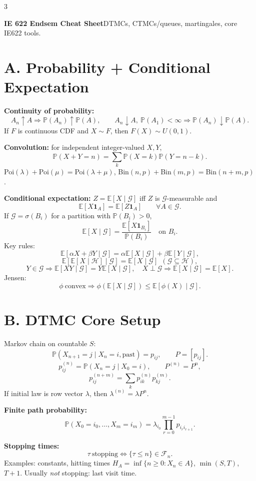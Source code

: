\documentclass[8pt]{extarticle}
\newcommand{\PP}{\mathbb{P}}
\newcommand{\E}{\mathbb{E}}
\newcommand{\1}{\mathbf{1}}
\newcommand{\cF}{\mathcal{F}}
\begin{document}
\tiny

\begin{multicols*}{3}

{\bfseries IE 622 Endsem Cheat Sheet}\hfill DTMCs, CTMCs/queues, martingales, core IE622 tools.\par

\section*{A. Probability + Conditional Expectation}
\textbf{Continuity of probability:}
\[
A_n\uparrow A \Rightarrow \PP(A_n)\uparrow \PP(A),\qquad
A_n\downarrow A,\ \PP(A_1)<\infty \Rightarrow \PP(A_n)\downarrow \PP(A).
\]
If $F$ is continuous CDF and $X\sim F$, then $F(X)\sim U(0,1)$.

\textbf{Convolution:} for independent integer-valued $X,Y$,
\[
\PP(X+Y=n)=\sum_k \PP(X=k)\PP(Y=n-k).
\]
Poi$(\lambda)+$Poi$(\mu)=$Poi$(\lambda+\mu)$, Bin$(n,p)+$Bin$(m,p)=$Bin$(n+m,p)$.

\textbf{Conditional expectation:} $Z=\E[X\mid\mathcal G]$ iff $Z$ is $\mathcal G$-measurable and
\[
\E[X\1_A]=\E[Z\1_A]\qquad \forall A\in\mathcal G.
\]
If $\mathcal G=\sigma(B_i)$ for a partition with $\PP(B_i)>0$,
\[
\E[X\mid\mathcal G]=\frac{\E[X\1_{B_i}]}{\PP(B_i)}\quad \text{on }B_i.
\]
Key rules:
\[
\E[\alpha X+\beta Y\mid\mathcal G]=\alpha\E[X\mid\mathcal G]+\beta\E[Y\mid\mathcal G],
\]
\[
\E[\E[X\mid\mathcal H]\mid\mathcal G]=\E[X\mid\mathcal G]\ \ (\mathcal G\subseteq\mathcal H),
\]
\[
Y\in\mathcal G \Rightarrow \E[XY\mid\mathcal G]=Y\E[X\mid\mathcal G],\quad
X\perp \mathcal G \Rightarrow \E[X\mid\mathcal G]=\E[X].
\]
Jensen:
\[
\phi\ \text{convex}\Rightarrow \phi(\E[X\mid\mathcal G])\le \E[\phi(X)\mid\mathcal G].
\]

\section*{B. DTMC Core Setup}
Markov chain on countable $S$:
\[
\PP(X_{n+1}=j\mid X_n=i,\text{past})=p_{ij},\qquad P=[p_{ij}].
\]
\[
p_{ij}^{(n)}=\PP(X_n=j\mid X_0=i),\qquad P^{(n)}=P^n,
\]
\[
p_{ij}^{(n+m)}=\sum_k p_{ik}^{(n)}p_{kj}^{(m)}.
\]
If initial law is row vector $\lambda$, then $\lambda^{(n)}=\lambda P^n$.

\textbf{Finite path probability:}
\[
\PP(X_0=i_0,\dots,X_m=i_m)=\lambda_{i_0}\prod_{r=0}^{m-1}p_{i_ri_{r+1}}.
\]

\textbf{Stopping times:}
\[
\tau\ \text{stopping}\iff \{\tau\le n\}\in\cF_n.
\]
Examples: constants, hitting times $H_A=\inf\{n\ge0:X_n\in A\}$, $\min(S,T)$, $T+1$.
Usually \emph{not} stopping: last visit time.


\end{multicols*}
\end{document}
